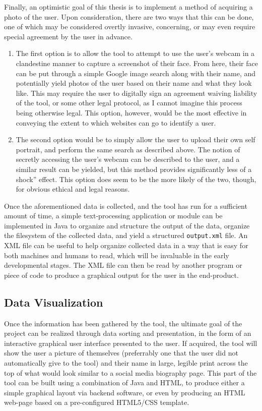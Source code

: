 \documentclass[11pt]{article}
\begin{document}
Finally, an optimistic goal of this thesis is to implement a method of acquiring a photo of the user. Upon consideration, there are two ways that this can be done, one of which may be considered overtly invasive, concerning, or may even require special agreement by the user in advance.
\begin{enumerate}
\item The first option is to allow the tool to attempt to use the user's webcam in a clandestine manner to capture a screenshot of their face. From here, their face can be put through a simple Google image search along with their name, and potentially yield photos of the user based on their name and what they look like. This may require the user to digitally sign an agreement waiving liability of the tool, or some other legal protocol, as I cannot imagine this process being otherwise legal. This option, however, would be the most effective in conveying the extent to which websites can go to identify a user.

\item The second option would be to simply allow the user to upload their own self portrait, and perform the same search as described above. The notion of secretly accessing the user's webcam can be described to the user, and a similar result can be yielded, but this method provides significantly less of a shock'' effect. This option does seem to be the more likely of the two, though, for obvious ethical and legal reasons.
\end{enumerate} 

Once the aforementioned data is collected, and the tool has run for a sufficient amount of time, a simple text-processing application or module can be implemented in Java to organize and structure the output of the data, organize the filesystem of the collected data, and yield a structured {\tt output.xml} file. An XML file can be useful to help organize collected data in a way that is easy for both machines and humans to read, which will be invaluable in the early developmental stages. The XML file can then be read by another program or piece of code to produce a graphical output for the user in the end-product.

\subsection{Data Visualization} \label{sec:data}
Once the information has been gathered by the tool, the ultimate goal of the project can be realized through data sorting and presentation, in the form of an interactive graphical user interface presented to the user. If acquired, the tool will show the user a picture of themselves (preferrably one that the user did not automatically give to the tool) and their name in large, legible print across the top of what would look similar to a social media biography page. This part of the tool can be built using a combination of Java and HTML, to produce either a simple graphical layout via backend software, or even by producing an HTML web-page based on a pre-configured HTML5/CSS template.
\end{document}

